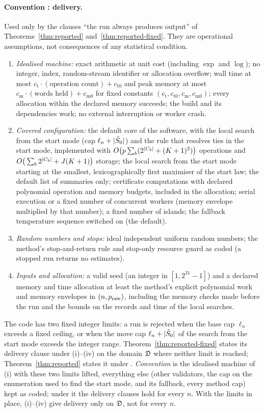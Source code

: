 \paragraph{Convention : delivery.} Used only by the clauses ``the run always produces output'' of
Theorems~\ref{thm:reported} and~\ref{thm:reported-fixed}. They are operational assumptions, not consequences of any
statistical condition.
\begin{enumerate}[label=(\roman*),leftmargin=2em]
  \item \emph{Idealised machine:} exact arithmetic at unit cost (including $\exp$ and $\log$); no integer, index,
    random-stream identifier or allocation overflow; wall time at most $c_{\mathrm t}\cdot(\text{operation count})+c_{\mathrm t0}$ and peak memory at
    most $c_{\mathrm m}\cdot(\text{words held})+c_{\mathrm m0}$ for fixed constants $(c_{\mathrm t},c_{\mathrm t0},c_{\mathrm m},c_{\mathrm m0})$; every allocation within
    the declared memory succeeds; the build and its dependencies work; no external interruption or worker crash.
  \item \emph{Covered configuration:} the default core of the software, with the local search from the start mode (cap
    $\ell_n+\lvert \tilde S_0\rvert$) and the rule that resolves ties in the start mode, implemented with
    $O\big(p\sum_b(2^{\lvert C_b\rvert}+(K+1)^2)\big)$ operations and $O\big(\sum_b2^{\lvert C_b\rvert}+J(K+1)\big)$ storage; the local
    search from the start mode starting at the smallest, lexicographically first maximiser of the start law; the default
    list of summaries only; certificate computations with declared polynomial operation and memory budgets, included in
    the allocation; serial execution or a fixed number of concurrent workers (memory envelope multiplied by that number);
    a fixed number of islands; the fallback temperature sequence switched on (the default).
  \item \emph{Random numbers and stops:} ideal independent uniform random numbers; the method's stop-and-return rule and
    stop-only resource guard as coded (a stopped run returns no estimates).
  \item \emph{Inputs and allocation:} a valid seed (an integer in $[1,2^{31}-1]$) and a declared memory and time allocation
    at least the method's explicit polynomial work and memory envelopes in $(n,p_{\mathrm{raw}})$, including the memory checks made before the run and
    the bounds on the records and time of the local searches.
\end{enumerate}
The code has two fixed integer limits: a run is rejected when the base cap $\ell_n$ exceeds a fixed ceiling, or when the
move cap $\ell_n+\lvert \tilde S_0\rvert$ of the search from the start mode exceeds the integer range. Theorem~\ref{thm:reported-fixed} states its delivery clause under (i)--(iv) on the domain $\mathfrak D$ where neither limit
is reached; Theorem~\ref{thm:reported} states it under . \emph{Convention } is the idealised machine of (i)
with these two limits lifted, everything else (other validators, the cap on the enumeration used to find the start mode, and its fallback, every
method cap) kept as coded; under it the delivery clauses hold for every $n$. With the limits in place, (i)--(iv) give delivery only on $\mathfrak D$, not for every
$n$.

